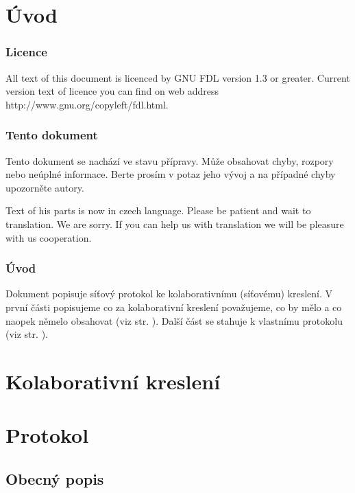 \documentclass[12pt,oneside,a4paper]{report}
\begin{document}
\tableofcontents
\newpage


\part{Úvod}

\section{Licence}

All text of this document is licenced by GNU FDL version 1.3 or greater. Current version text of licence you can find on web address http://www.gnu.org/copyleft/fdl.html.

\section{Tento dokument}

Tento dokument se nachází ve stavu přípravy. Může obsahovat chyby, rozpory nebo neúplné informace. Berte prosím v potaz jeho vývoj a na případné chyby upozorněte autory.

Text of his parts is now in czech language. Please be patient and wait to translation. We are sorry. If you can help us with translation we will be pleasure with us cooperation.

\section{Úvod}

Dokument popisuje síťový protokol ke kolaborativnímu (síťovému) kreslení. V první části popisujeme co za kolaborativní kreslení považujeme, co by mělo a co naopek němelo obsahovat (viz str. \ref{part.colaborative-painting}). Další část se stahuje k vlastnímu protokolu (viz str. \ref{part.protocol}).

\part{Kolaborativní kreslení}
\label{part.colaborative-painting}


\part{Protokol}
\label{part.protocol}


\chapter{Obecný popis}
\end{document}
